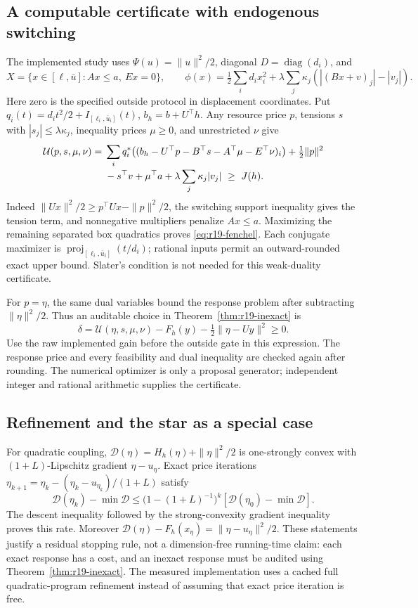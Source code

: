 \subsection{A computable certificate with endogenous switching}
The implemented study uses $\Psi(u)=\|u\|^2/2$, diagonal $D=\operatorname{diag}(d_i)$, and
\[
 X=\{x\in[\ell,\bar u]:Ax\leq a,\ Ex=0\},\qquad
 \phi(x)=\tfrac12\sum_i d_ix_i^2+
 \lambda\sum_j\kappa_j(|(Bx+v)_j|-|v_j|).
\]
Here zero is the specified outside protocol in displacement coordinates. Put $q_i(t)=d_it^2/2+I_{[\ell_i,\bar u_i]}(t)$, $b_h=b+U^\top h$. Any resource price $p$, tensions $s$ with $|s_j|\leq\lambda\kappa_j$, inequality prices $\mu\geq0$, and unrestricted $\nu$ give
\begin{align}
 \mathcal U(p,s,\mu,\nu)={}&
 \sum_i q_i^*\big((b_h-U^\top p-B^\top s-A^\top\mu-E^\top\nu)_i\big)
 +\tfrac12\|p\|^2\notag\\[-2pt]
 &-s^\top v+\mu^\top a+\lambda\sum_j\kappa_j|v_j|\ \geq\ J(h).
 \label{eq:r19-fenchel}
\end{align}
Indeed $\|Ux\|^2/2\geq p^\top Ux-\|p\|^2/2$, the switching support inequality gives the tension term, and nonnegative multipliers penalize $Ax\leq a$. Maximizing the remaining separated box quadratics proves \eqref{eq:r19-fenchel}. Each conjugate maximizer is $\operatorname{proj}_{[\ell_i,\bar u_i]}(t/d_i)$; rational inputs permit an outward-rounded exact upper bound. Slater's condition is not needed for this weak-duality certificate.

For $p=\eta$, the same dual variables bound the response problem after subtracting $\|\eta\|^2/2$. Thus an auditable choice in Theorem~\ref{thm:r19-inexact} is
\begin{equation}\label{eq:r19-deltacompute}
 \delta=\mathcal U(\eta,s,\mu,\nu)-F_h(y)
                  -\tfrac12\|\eta-Uy\|^2\geq0.
\end{equation}
Use the raw implemented gain before the outside gate in this expression. The response price and every feasibility and dual inequality are checked again after rounding. The numerical optimizer is only a proposal generator; independent integer and rational arithmetic supplies the certificate.

\subsection{Refinement and the star as a special case}
For quadratic coupling, $\mathcal D(\eta)=H_h(\eta)+\|\eta\|^2/2$ is one-strongly convex with $(1+L)$-Lipschitz gradient $\eta-u_\eta$. Exact price iterations
$\eta_{k+1}=\eta_k-(\eta_k-u_{\eta_k})/(1+L)$ satisfy
\[
 \mathcal D(\eta_k)-\min\mathcal D
 \leq\bigl(1-(1+L)^{-1}\bigr)^k
        [\mathcal D(\eta_0)-\min\mathcal D].
\]
The descent inequality followed by the strong-convexity gradient inequality proves this rate. Moreover $\mathcal D(\eta)-F_h(x_\eta)=\|\eta-u_\eta\|^2/2$. These statements justify a residual stopping rule, not a dimension-free running-time claim: each exact response has a cost, and an inexact response must be audited using Theorem~\ref{thm:r19-inexact}. The measured implementation uses a cached full quadratic-program refinement instead of assuming that exact price iteration is free.

